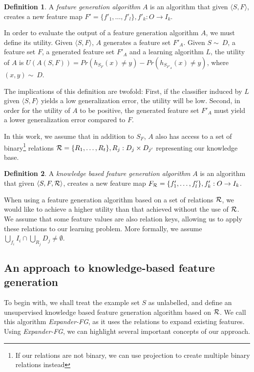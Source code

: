 \documentclass{article}
\theoremstyle{definition}
\newtheorem{defn}{Definition}[section]
\begin{document}
\begin{defn}
	A \emph{feature generation algorithm} $A$ is an algorithm that given $\langle S,F\rangle$, creates a new feature map $F'=\{f'_{1},\ldots,f'_{l}\}, f'_{k}:O\rightarrow I_k$.
\end{defn}

In order to evaluate the output of a feature generation algorithm $A$, we must define its utility. Given $\langle S,F \rangle$, $A$ generates a feature set $F'_A$.
Given $S\sim\ D$, a feature set $F$, a generated feature set $F'_A$ and a learning algorithm $L$, the utility of $A$ is $U(A(S,F))=Pr(h_{S_F}(x)\neq y)-Pr(h_{S_{F'_A}}(x)\neq y)$, where $(x,y)\sim\ D$.

The implications of this definition are twofold: First, if the classifier induced by $L$ given  $\langle S,F \rangle$ yields a low generalization error, the utility will be low. Second, in order for the utility of $A$ to be positive, the generated feature set $F'_A$ must yield a lower generalization error compared to $F$.

In this work, we assume that in addition to $S_F$, $A$ also has access to a set of binary\footnote{If our relations are not binary, we can use projection to create multiple binary relations instead} relations ${\cal R}=\{R_{1},\ldots,R_{t}\}, R_j:D_j\times D_{j'}$ representing our knowledge base. 
\begin{defn}
	A \emph{knowledge based feature generation algorithm} $A$ is an algorithm that given $\langle S,F,{\cal R} \rangle$, creates a new feature map $F_{{\cal R}}=\{f'_{1},\ldots,f'_{l}\}, f'_{k}:O\rightarrow I_k$.
\end{defn}

When using a feature generation algorithm based on a set of relations ${\cal R}$, we would like to achieve a higher utility than that achieved without the use of ${\cal R}$. We assume that some feature values are also relation keys, allowing us to apply these relations to our learning problem. More formally, we assume 
 $\bigcup_{f_i} I_i \cap \bigcup_{R_j} D_j \neq \emptyset$. 

\subsection{An approach to knowledge-based feature generation} \label{shallow_section}

To begin with, we shall treat the example set $S$ as unlabelled, and define an unsupervised knowledge based feature generation algorithm based on ${\cal R}$. We call this algorithm \emph{Expander-FG}, as it uses the relations to expand existing features. Using \emph{Expander-FG}, we can highlight several important concepts of our approach.
\end{document}

